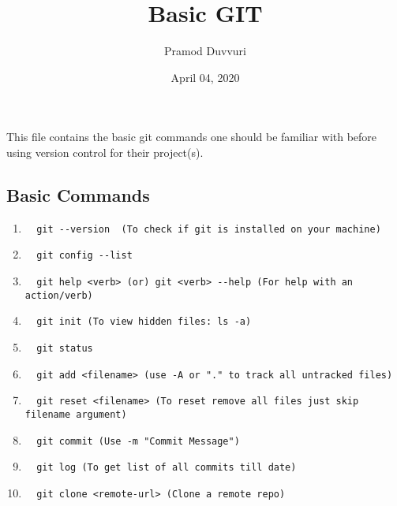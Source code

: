 \documentclass[11pt]{article}
\title{Basic GIT}
\author{Pramod Duvvuri}
\date{April 04, 2020}
\begin{document}
	\maketitle
	This file contains the basic git commands one should be familiar with before using version control for their project(s).
   \subsection*{Basic Commands}
   \begin{enumerate}
   	\item \begin{verbatim}  git --version  (To check if git is installed on your machine)\end{verbatim}
   	\item \begin{verbatim}  git config --list\end{verbatim}
   	\item \begin{verbatim}  git help <verb> (or) git <verb> --help (For help with an action/verb) \end{verbatim}
   	\item \begin{verbatim}  git init (To view hidden files: ls -a)\end{verbatim}
    \item \begin{verbatim}  git status \end{verbatim}  	
    \item \begin{verbatim}  git add <filename> (use -A or "." to track all untracked files)\end{verbatim}  	
    \item \begin{verbatim}  git reset <filename> (To reset remove all files just skip filename argument) \end{verbatim}  	
    \item \begin{verbatim}  git commit (Use -m "Commit Message") \end{verbatim}  	
    \item \begin{verbatim}  git log (To get list of all commits till date)\end{verbatim}  	
    \item \begin{verbatim}  git clone <remote-url> (Clone a remote repo) \end{verbatim}  

\end{enumerate}
\end{document}
